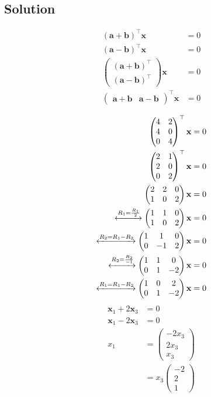 \documentclass[journal,10pt,twocolumn]{article}
\newcommand{\myvec}[1]{\ensuremath{\begin{pmatrix}#1\end{pmatrix}}}
\let\vec\mathbf
\let\vec\mathbf
\begin{document}
\begin{enumerate}
\section{Solution}
\begin{align} 
(\vec{a}+\vec{b})^\top\vec{x}&=0 \\
(\vec{a}-\vec{b})^\top\vec{x}&=0\\
\myvec{(\vec{a}+\vec{b})^\top\\ (\vec{a}-\vec{b})^\top}\vec{x}&=0\\
\myvec{\vec{a}+\vec{b}& \vec{a}-\vec{b}}^\top\vec{x}&=0\\
\end{align}
\begin{align}
\myvec{
4&2\\
4&0\\
0&4
}^\top \vec{x}&=0\\
\myvec{
2&1\\
2&0\\
0&2
}^\top \vec{x}&=0\\
\myvec{
2&2&0\\
1&0&2
}\vec{x}&=0\\
\xleftrightarrow[]{R_1=\frac{R_1}{2}}
\myvec{
1&1&0\\
1&0&2
}\vec{x}&=0\\
\xleftrightarrow[]{R_2={R_1}-{R_2}}
\myvec{
1&1&0\\
0&-1&2
}\vec{x}&=0\\
\xleftrightarrow[]{R_2=\frac{R_2}{-1}}
\myvec{
1&1&0\\
0&1&-2
}\vec{x}&=0\\
\xleftrightarrow[]{R_1={R_1}-{R_2}}
\myvec{
1&0&2\\
0&1&-2
}\vec{x}&=0\\
\end{align}
\begin{align}
\vec{x}_1+2\vec{x}_3&=0\\
\vec{x}_1-2\vec{x}_3&=0\\
x_1&=\myvec{-2x_3\\2x_3\\x_3}\\
&=x_3\myvec{-2\\2\\1}
\end{align}   
\end{enumerate} 
\end{document}
